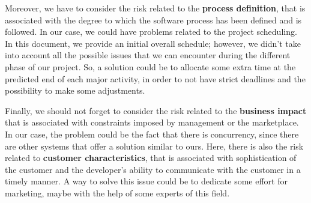Moreover, we have to consider the risk related to the \textbf{process definition}, that is associated with the degree to which the software process has been defined and is followed. In our case, we could have problems related to the project scheduling. In this document, we provide an initial overall schedule; however, we didn't take into account all the possible issues that we can encounter during the different phase of our project. So, a solution could be to allocate some extra time at the predicted end of each major activity, in order to not have strict deadlines and the possibility to make some adjustments. 

Finally, we should not forget to consider the risk related to the \textbf{business impact} that is associated with constraints imposed by management or the marketplace. In our case, the problem could be the fact that there is concurrency, since there are other systems that offer a solution similar to ours. Here, there is also the risk related to \textbf{customer characteristics}, that is associated with sophistication of the customer and the developer's ability to communicate with the customer in a timely manner. A way to solve this issue could be to dedicate some effort for marketing, maybe with the help of some experts of this field.